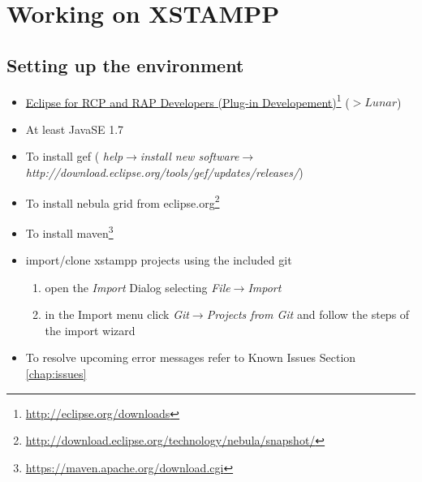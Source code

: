 \section{Working on XSTAMPP}

\subsection{Setting up the environment}
\begin{itemize}
\item \href{http://eclipse.org/downloads}{Eclipse for RCP and RAP Developers (Plug-in Developement)}\footnote{\url{http://eclipse.org/downloads}} ($> Lunar$)
\item At least JavaSE 1.7
\item To install gef ( \textit{help}$\rightarrow$\textit{install new software}$\rightarrow$\textit{http://download.eclipse.org/tools/gef/updates/releases/})
\item To install nebula grid from eclipse.org\footnote{\url{http://download.eclipse.org/technology/nebula/snapshot/}}
\item To install maven\footnote{\url{https://maven.apache.org/download.cgi}}
\item import/clone xstampp projects using the included git
	\begin{enumerate}
	\item open the \textit{Import} Dialog selecting \textit{File}$\rightarrow$\textit{Import}
	\item in the Import menu click \textit{Git}$\rightarrow$\textit{Projects from Git} and follow the steps of the import wizard
	\end{enumerate}
\item To resolve upcoming error messages refer to Known Issues Section \ref{chap:issues}
\end{itemize}

